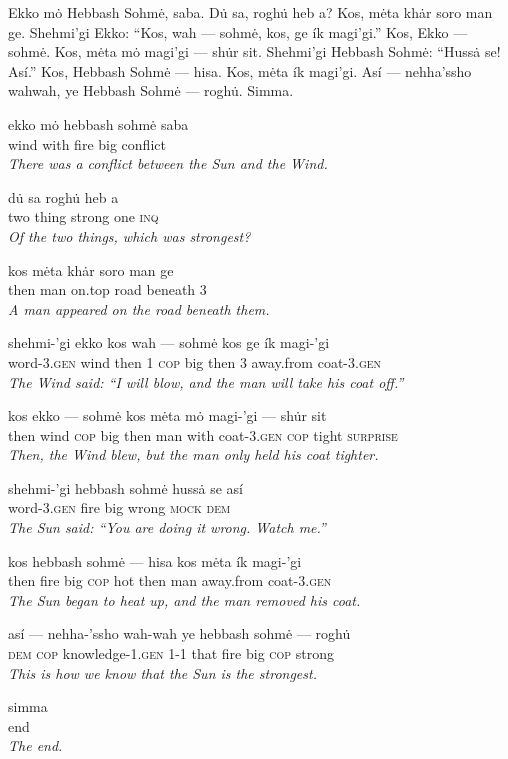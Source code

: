 \documentclass{article}[10pt]
\begin{document}
Ekko m\.{o} Hebbash Sohm\.{e}, saba. D\.{u} sa, rogh\.{u} heb a? Kos, m\.{e}ta kh\.{a}r soro man ge. Shehmi'gi Ekko: ``Kos, wah --- sohm\.{e}, kos, ge \'{i}k magi'gi.'' Kos, Ekko --- sohm\.{e}. Kos, m\.{e}ta m\.{o} magi'gi --- sh\.{u}r sit. Shehmi'gi Hebbash Sohm\.{e}: ``Huss\.{a} se! As\'{i}.'' Kos, Hebbash Sohm\.{e} --- hisa. Kos, m\.{e}ta \'{i}k magi'gi. As\'{i} --- nehha'ssho wahwah, ye Hebbash Sohm\.{e} --- rogh\.{u}. Simma.

\begin{exe}
\ex
\gll ekko m\.{o} hebbash sohm\.{e} saba\\
wind with fire big conflict\\
\trans \emph{There was a conflict between the Sun and the Wind.}

\ex
\gll d\.{u} sa rogh\.{u} heb a\\
two thing strong one \textsc{inq}\\
\trans \emph{Of the two things, which was strongest?}

\ex
\gll kos m\.{e}ta kh\.{a}r soro man ge\\
then man on.top road beneath 3\\
\trans \emph{A man appeared on the road beneath them.}

\ex
\gll shehmi-'gi ekko kos wah --- sohm\.{e} kos ge \'{i}k magi-'gi\\
word-\textsc{3.gen} wind then 1 \textsc{cop} big then 3 away.from coat-\textsc{3.gen}\\
\trans \emph{The Wind said: ``I will blow, and the man will take his coat off.''}

\ex
\gll kos ekko --- sohm\.{e} kos m\.{e}ta m\.{o} magi-'gi --- sh\.{u}r sit\\
then wind \textsc{cop} big then man with coat-\textsc{3.gen} \textsc{cop} tight \textsc{surprise}\\
\trans \emph{Then, the Wind blew, but the man only held his coat tighter.}

\ex
\gll shehmi-'gi hebbash sohm\.{e} huss\.{a} se as\'{i}\\
word-\textsc{3.gen} fire big wrong \textsc{mock} \textsc{dem}\\
\trans \emph{The Sun said: ``You are doing it wrong. Watch me.''}

\ex
\gll kos hebbash sohm\.{e} --- hisa kos m\.{e}ta \'{i}k magi-'gi\\
then fire big \textsc{cop} hot then man away.from coat-\textsc{3.gen}\\
\trans \emph{The Sun began to heat up, and the man removed his coat.}

\ex
\gll  as\'{i} --- nehha-'ssho wah-wah ye hebbash sohm\.{e} --- rogh\.{u}\\
\textsc{dem} \textsc{cop} knowledge-1.\textsc{gen} 1-1 that fire big \textsc{cop} strong\\
\trans \emph{This is how we know that the Sun is the strongest.}

\ex
\gll  simma\\
end\\
\trans \emph{The end.}
\end{exe}
\clearpage
\end{document}
